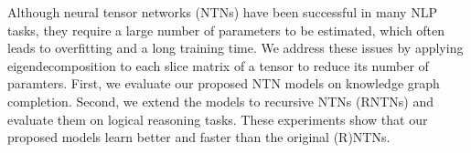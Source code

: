 Although neural tensor networks (NTNs) have been successful in many NLP tasks, they require a large number of parameters to be estimated, which often leads to overfitting and a long training time. We address these issues by applying eigendecomposition to each slice matrix of a tensor to reduce its number of paramters. First, we evaluate our proposed NTN models on knowledge graph completion. Second, we extend the models to recursive NTNs (RNTNs) and evaluate them on logical reasoning tasks. These experiments show that our proposed models learn better and faster than the original (R)NTNs.
